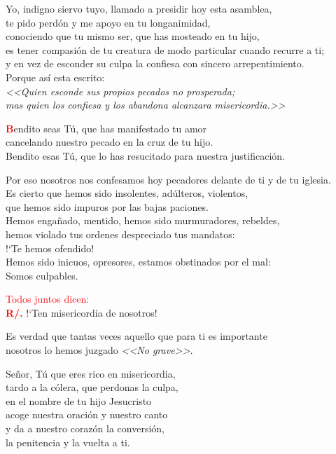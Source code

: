 \documentclass[12pt, letterpaper]{report}
\begin{document}
\noindent
\Large {Yo, indigno siervo tuyo, llamado a presidir hoy esta asamblea,\\
te pido perd\'on y me apoyo en tu longanimidad,\\
conociendo que tu mismo ser, que has mosteado en tu hijo,\\
es tener compasi\'on de tu creatura de modo particular cuando recurre a ti;\\
y en vez de esconder su culpa la confiesa con sincero arrepentimiento.\\
Porque as\'i esta escrito:\\
\em <<Quien esconde sus propios pecados no prosperada;\\
mas quien los confiesa y los abandona alcanzara misericordia.>>
}

\lettrine[lines=2]{\bfseries \textcolor{red}{B}}{}\Large {endito seas T\'u, que has manifestado tu amor\\
cancelando nuestro pecado en la cruz de tu hijo.\\
Bendito esas T\'u, que lo has resucitado para nuestra justificaci\'on.}

\noindent
\Large {Por eso nosotros nos confesamos hoy pecadores delante de ti y de tu iglesia.\\
Es cierto que hemos sido insolentes, ad\'ulteros, violentos,\\
que hemos sido impuros por las bajas paciones.\\
Hemos enga\~nado, mentido, hemos sido murmuradores, rebeldes,\\
hemos violado tus ordenes despreciado tus mandatos:\\
!`Te hemos ofendido!\\
Hemos sido inicuos, opresores, estamos obstinados por el mal:\\
Somos culpables.}

\large {\textcolor{red}{Todos juntos dicen:}}\\
\noindent
\Large {\bfseries \textcolor{red}{R/.}} \hspace{0.5cm} !`Ten misericordia de nosotros!

\noindent
\Large {Es verdad que tantas veces aquello que para ti es importante\\
nosotros lo hemos juzgado \em <<No grave>>.}

\noindent
\Large {Se\~nor, T\'u que eres rico en misericordia,\\
tardo a la c\'olera, que perdonas la culpa,\\
en el nombre de tu hijo Jesucristo\\
acoge nuestra oraci\'on y nuestro canto\\
y da a nuestro coraz\'on la conversi\'on,\\
la penitencia y la vuelta a ti.}
\end{document}
